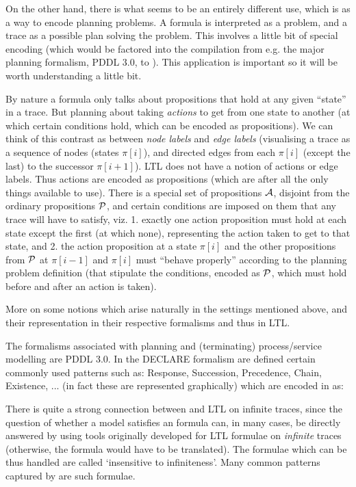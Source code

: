 On the other hand, there is what seems to be an entirely different use, which is as a way to encode planning problems.
A formula is interpreted as a problem, and a trace as a possible plan solving the problem.
This involves a little bit of special encoding (which would be factored into the compilation from e.g. the major planning formalism,
PDDL 3.0, to \ltlf). This application is important so it will be worth understanding a little bit.

By nature a formula only talks about propositions that hold at any given ``state'' in a trace.
But planning about taking \emph{actions} to get from one state to another (at which certain conditions hold, which can be encoded as propositions).
We can think of this contrast as between \emph{node labels} and \emph{edge labels}
(visualising a trace as a sequence of nodes (states $\pi[i]$), and directed edges from each $\pi[i]$ (except the last) to the successor $\pi[i+1]$).
LTL does not have a notion of actions or edge labels.
Thus actions are encoded as propositions (which are after all the only things available to use).
There is a special set of propositions $\mathcal{A}$, disjoint from the ordinary propositions $\mathcal{P}$,
and certain conditions are imposed on them that any trace will have to satisfy, viz.
1. exactly one action proposition must hold at each state except the first (at which none),
representing the action taken to get to that state,
and 2. the action proposition at a state $\pi[i]$
and the other propositions from $\mathcal{P}$ at $\pi[i-1]$ and $\pi[i]$ must
``behave properly'' according to the planning problem definition (that stipulate the conditions, encoded as $\mathcal{P}$, which must hold before and after an action is taken).

More on some notions which arise naturally in the settings mentioned above,
and their representation in their respective formalisms and thus in LTL.

The formalisms associated with planning and (terminating) process/service modelling are
PDDL 3.0.
In the DECLARE formalism are defined certain commonly used patterns such as:
Response, Succession, Precedence, Chain, Existence, ...
(in fact these are represented graphically)
which are encoded in \ltlf as:


There is quite a strong connection between \ltlf and LTL on infinite traces,
since the question of whether a model satisfies an \ltlf formula can,
in many cases, be directly answered by using tools originally developed for LTL formulae on
\emph{infinite} traces (otherwise, the formula would have to be translated).
The formulae which can be thus handled are called `insensitive to infiniteness'.
\cite{ldlfinsens}
Many common patterns captured by \ltlf are such formulae.

